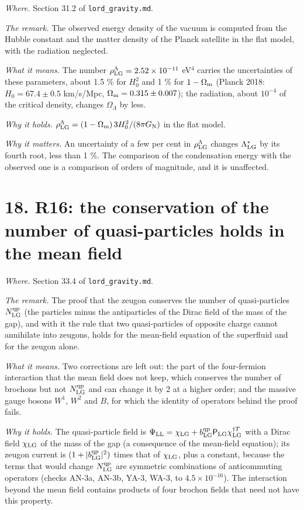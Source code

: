 \documentclass[
  10pt,
]{article}
\begin{document}
\emph{Where.} Section 31.2 of \texttt{lord\_gravity.md}.

\emph{The remark.} The observed energy density of the vacuum is computed
from the Hubble constant and the matter density of the Planck satellite
in the flat model, with the radiation neglected.

\emph{What it means.} The number
\(\rho^\Lambda_{\rm LG}=2.52\times10^{-11}\) eV\(^4\) carries the
uncertainties of these parameters, about 1.5 \% for \(H_0^2\) and 1 \%
for \(1-\Omega_{\rm m}\) (Planck 2018: \(H_0=67.4\pm0.5\) km/s/Mpc,
\(\Omega_{\rm m}=0.315\pm0.007\)); the radiation, about \(10^{-4}\) of
the critical density, changes \(\Omega_\Lambda\) by less.

\emph{Why it holds.}
\(\rho^\Lambda_{\rm LG}=(1-\Omega_{\rm m})\,3H_0^2/(8\pi G_{\rm N})\) in
the flat model.

\emph{Why it matters.} An uncertainty of a few per cent in
\(\rho^\Lambda_{\rm LG}\) changes \(\Lambda^*_{\rm LG}\) by its fourth
root, less than 1 \%. The comparison of the condensation energy with the
observed one is a comparison of orders of magnitude, and it is
unaffected.

\hypertarget{r16-the-conservation-of-the-number-of-quasi-particles-holds-in-the-mean-field}{%
\section{18. R16: the conservation of the number of quasi-particles
holds in the mean
field}\label{r16-the-conservation-of-the-number-of-quasi-particles-holds-in-the-mean-field}}

\emph{Where.} Section 33.4 of \texttt{lord\_gravity.md}.

\emph{The remark.} The proof that the zeugon conserves the number of
quasi-particles \(N^{\rm qp}_{\rm LG}\) (the particles minus the
antiparticles of the Dirac field of the mass of the gap), and with it
the rule that two quasi-particles of opposite charge cannot annihilate
into zeugons, holds for the mean-field equation of the superfluid and
for the zeugon alone.

\emph{What it means.} Two corrections are left out: the part of the
four-fermion interaction that the mean field does not keep, which
conserves the number of brochons but not \(N^{\rm qp}_{\rm LG}\) and can
change it by 2 at a higher order; and the massive gauge bosons \(W^1\),
\(W^2\) and \(B\), for which the identity of operators behind the proof
fails.

\emph{Why it holds.} The quasi-particle field is
\(\Psi_{\rm LL}=\chi_{\rm LG}+b^{\rm qp}_{\rm LG}\mathsf P_{\rm LG}\chi_{\rm LG}^{\dagger T}\)
with a Dirac field \(\chi_{\rm LG}\) of the mass of the gap (a
consequence of the mean-field equation); its zeugon current is
\((1+\lvert b^{\rm qp}_{\rm LG}\rvert^2)\) times that of
\(\chi_{\rm LG}\), plus a constant, because the terms that would change
\(N^{\rm qp}_{\rm LG}\) are symmetric combinations of anticommuting
operators (checks AN-3a, AN-3b, YA-3, WA-3, to \(4.5\times10^{-16}\)).
The interaction beyond the mean field contains products of four brochon
fields that need not have this property.
\end{document}
